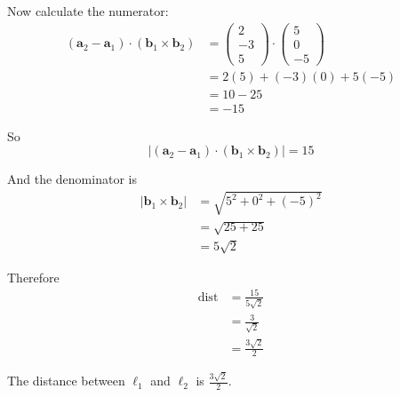 \documentclass[leqno]{article}
\begin{document}
\begin{enumerate}[
  label=\textbf{\arabic*.},
  leftmargin=*,
  topsep=0pt,
  partopsep=0pt,
  parsep=0pt
]
\begin{djsSolution}
\begin{enumerate}[label=\textbf{(\alph*)}]
Now calculate the numerator:
\begin{align*}
(\mathbf a_2-\mathbf a_1)\cdot(\mathbf b_1\times\mathbf b_2)
&=\begin{pmatrix}2\\-3\\5\end{pmatrix}\cdot\begin{pmatrix}5\\0\\-5\end{pmatrix} \\
&=2(5)+(-3)(0)+5(-5) \\
&=10-25 \\
&=-15
\end{align*}

So
\[
\left\lvert(\mathbf a_2-\mathbf a_1)\cdot(\mathbf b_1\times\mathbf b_2)\right\rvert=15
\]

And the denominator is
\begin{align*}
\left\lvert\mathbf b_1\times\mathbf b_2\right\rvert
&=\sqrt{5^2+0^2+(-5)^2} \\
&=\sqrt{25+25} \\
&=5\sqrt2
\end{align*}

Therefore
\begin{align*}
\mathrm{dist}
&=\frac{15}{5\sqrt2} \\
&=\frac{3}{\sqrt2} \\
&=\frac{3\sqrt2}{2}
\end{align*}

The distance between \(\ell_1\) and \(\ell_2\) is \(\frac{3\sqrt2}{2}\).
\end{enumerate}
\end{djsSolution}


\newpage

\questionitem


\end{enumerate}
\end{document}
